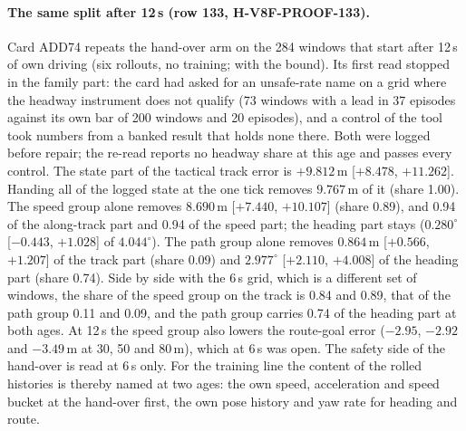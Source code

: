 \paragraph{The same split after 12\,s (row 133, H-V8F-PROOF-133).} Card ADD74 repeats the hand-over arm on the 284 windows that start after 12\,s of own driving (six rollouts, no training;  with the bound). Its first read stopped in the family part: the card had asked for an unsafe-rate name on a grid where the headway instrument does not qualify (73 windows with a lead in 37 episodes against its own bar of 200 windows and 20 episodes), and a control of the tool took numbers from a banked result that holds none there. Both were logged before repair; the re-read reports no headway share at this age and passes every control. The state part of the tactical track error is $+9.812$\,m [$+8.478$, $+11.262$]. Handing all of the logged state at the one tick removes $9.767$\,m of it (share 1.00). The speed group alone removes $8.690$\,m [$+7.440$, $+10.107$] (share 0.89), and 0.94 of the along-track part and 0.94 of the speed part; the heading part stays ($0.280^\circ$ [$-0.443$, $+1.028$] of $4.044^\circ$). The path group alone removes $0.864$\,m [$+0.566$, $+1.207$] of the track part (share 0.09) and $2.977^\circ$ [$+2.110$, $+4.008$] of the heading part (share 0.74). Side by side with the 6\,s grid, which is a different set of windows, the share of the speed group on the track is 0.84 and 0.89, that of the path group 0.11 and 0.09, and the path group carries 0.74 of the heading part at both ages. At 12\,s the speed group also lowers the route-goal error ($-2.95$, $-2.92$ and $-3.49$\,m at 30, 50 and 80\,m), which at 6\,s was open. The safety side of the hand-over is read at 6\,s only. For the training line the content of the rolled histories is thereby named at two ages: the own speed, acceleration and speed bucket at the hand-over first, the own pose history and yaw rate for heading and route.

